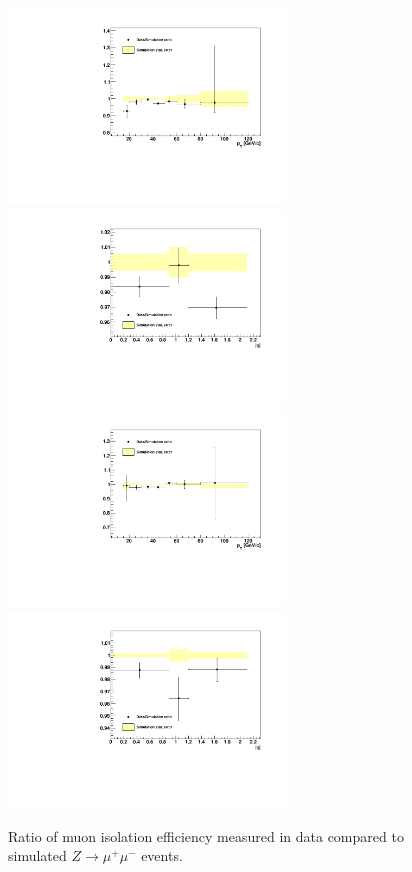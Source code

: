 \begin{figure}[t]
\begin{center}
\includegraphics*[height=52mm]{corrections_chapter/figures/pt_iso_pt_scaled.pdf}
\includegraphics*[height=52mm]{corrections_chapter/figures/etatrig_iso_abseta_scaled.pdf}
\includegraphics*[height=52mm]{corrections_chapter/figures/pt_trigCompX_pt_scaled.pdf}
\includegraphics*[height=52mm]{corrections_chapter/figures/etatrig_trigCompX_abseta_scaled.pdf}
\caption[Muon isolation correction factors]{Ratio of muon isolation efficiency
measured in data compared to simulated $Z\rightarrow\mu^+\mu^-$ events.}
\label{fig:MuonIsoCorrVersusPt}
\end{center}
\end{figure} 

